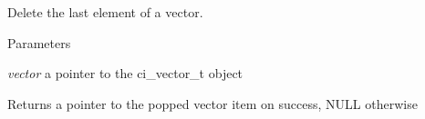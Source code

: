 Delete the last element of a vector. 
\begin{DoxyParams}{Parameters}
\item[{\em vector}]a pointer to the ci\_\-vector\_\-t object \end{DoxyParams}
\begin{DoxyReturn}{Returns}
a pointer to the popped vector item on success, NULL otherwise 
\end{DoxyReturn}
